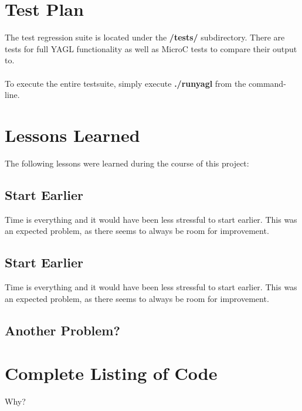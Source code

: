\documentclass[12pt]{article}
\begin{document}
\section{Test Plan}
The test regression suite is located under the \textbf{/tests/} subdirectory. There are tests for full YAGL functionality as well as MicroC tests to compare their output to.\\\\

To execute the entire testsuite, simply execute \textbf{./runyagl} from the command-line.

\section{Lessons Learned}
The following lessons were learned during the course of this project:\\

\subsection{Start Earlier}
Time is everything and it would have been less stressful to start earlier. This was an expected problem, as there seems to always be room for improvement.

\subsection{Start Earlier}
Time is everything and it would have been less stressful to start earlier. This was an expected problem, as there seems to always be room for improvement.

\subsection{Another Problem?}


\section{Complete Listing of Code}
Why?
\end{document}
